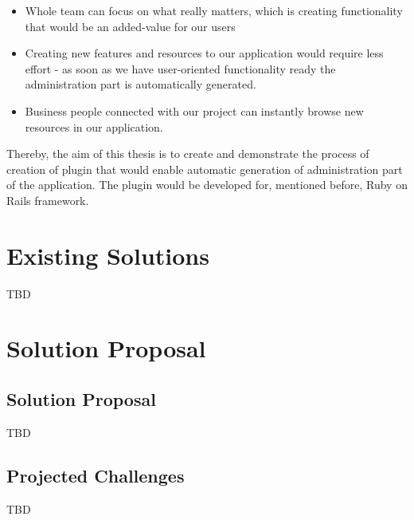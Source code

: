   \begin{itemize}
	  \item Whole team can focus on what really matters, which is creating functionality that would be an added-value for our users
	  \item Creating new features and resources to our application would require less effort - as soon as we have user-oriented functionality ready the administration part is automatically generated.
	  \item Business people connected with our project can instantly browse new resources in our application.
	\end{itemize}
  
  Thereby, the aim of this thesis is to create and demonstrate the process of creation of plugin that would enable automatic generation of administration part of the application. The plugin would be developed for, mentioned before, Ruby on Rails framework.
  
  \section{Existing Solutions}
  TBD
  
  \section{Solution Proposal}
    \subsection{Solution Proposal}
    TBD
  
    \subsection{Projected Challenges}
    TBD